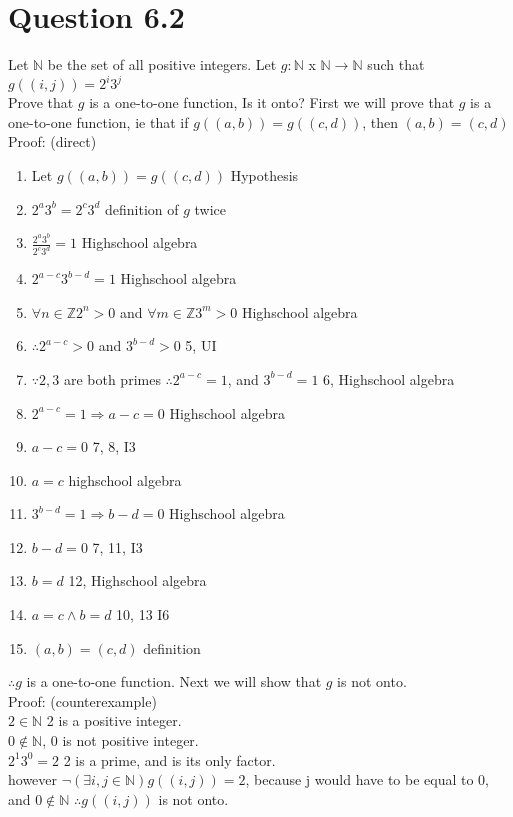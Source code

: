 \documentclass{article}
\begin{document}
	\section{Question 6.2}
		Let $\mathbb{N}$ be the set of all positive integers. Let $g : \mathbb{N}$ x $\mathbb{N} \to \mathbb{N}$ such that \\
			$g((i, j)) = 2^{i}3^{j}$ \\
		Prove that $g$ is a one-to-one function, Is it onto?
		First we will prove that $g$ is a one-to-one function, ie that if $g((a, b)) = g((c, d))$, then $(a, b) = (c, d)$
		Proof: (direct)
		\begin{enumerate}
			\item Let $g((a, b)) = g((c, d))$ \hfill Hypothesis
			\item $2^{a}3^{b} = 2^{c}3^{d}$ \hfill definition of $g$ twice
			\item $\frac{2^{a}3^{b}}{2^{c}3^{d}} = 1$ \hfill Highschool algebra
			\item $2^{a-c}3^{b-d} = 1$ \hfill Highschool algebra
			\item $\forall n \in \mathbb{Z} 2^{n} > 0$ and $\forall m \in \mathbb{Z} 3^{m} > 0$ \hfill Highschool algebra
			\item $\therefore 2^{a - c} > 0$ and $3^{b - d} > 0$ \hfill 5, UI
			\item $\because 2, 3$ are both primes $\therefore 2^{a-c} = 1$, and $3^{b-d} = 1$ \hfill 6, Highschool algebra
			\item $2^{a-c} = 1 \Rightarrow a - c = 0$ \hfill Highschool algebra
			\item $a - c = 0$ \hfill 7, 8, I3
			\item $a = c$ \hfill highschool algebra
			\item $3^{b-d} = 1 \Rightarrow b - d = 0$ \hfill Highschool algebra
			\item $b - d = 0$ \hfill 7, 11, I3
			\item $b = d$ \hfill 12, Highschool algebra
			\item $a = c \land b = d$ \hfill 10, 13 I6
			\item $(a, b) = (c, d)$ \hfill definition
		\end{enumerate}
		$\therefore g$ is a one-to-one function. 
		Next we will show that $g$ is not onto. \\
		Proof: (counterexample) \\
		$2 \in \mathbb{N}$ \hfill 2 is a positive integer. \\
		$0 \notin \mathbb{N}$, \hfill 0 is not positive integer. \\
		$2^{1}3^{0} = 2$ \hfill 2 is a prime, and is its only factor. \\
		however $\lnot(\exists i, j \in \mathbb{N}) g((i, j)) = 2$, because j would have to be equal to 0, and $0 \notin \mathbb{N}$
		$\therefore g((i, j))$ is not onto.
\end{document}
